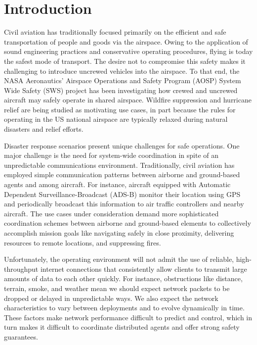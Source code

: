 \section{Introduction}
\label{sec:introduction}

Civil aviation has traditionally focused primarily on the efficient
and safe transportation of people and goods via the airspace. Owing to
the application of sound engineering practices and conservative
operating procedures, flying is today the safest mode of
transport. The desire not to compromise this safety makes it
challenging to introduce uncrewed vehicles into the airspace. To that
end, the NASA Aeronautics' Airspace Operations and Safety Program
(AOSP) System Wide Safety (SWS) project has been investigating how
crewed and uncrewed aircraft may safely operate in shared
airspace. Wildfire suppression and hurricane relief are being studied
as motivating use cases, in part because the rules for operating in
the US national airspace are typically relaxed during natural
disasters and relief efforts.

Disaster response scenarios present unique challenges for safe
operations. One major challenge is the need for system-wide
coordination in spite of an unpredictable communications
environment. Traditionally, civil aviation has employed simple
communication patterns between airborne and ground-based agents and
among aircraft. For instance, aircraft equipped with Automatic
Dependent Surveillance-Broadcast (ADS-B) monitor their location using
GPS and periodically broadcast this information to air traffic
controllers and nearby aircraft. The use cases under consideration
demand more sophisticated coordination schemes between airborne and
ground-based elements to collectively accomplish mission goals like
navigating safely in close proximity, delivering resources to remote
locations, and suppressing fires.

Unfortunately, the operating environment will not admit the use of
reliable, high-throughput internet connections that consistently allow
clients to transmit large amounts of data to each other quickly. For
instance, obstructions like distance, terrain, smoke, and weather mean
we should expect network packets to be dropped or delayed in
unpredictable ways. We also expect the network characteristics to vary
between deployments and to evolve dynamically in time. These factors
make network performance difficult to predict and control, which in
turn makes it difficult to coordinate distributed agents and offer
strong safety guarantees.

